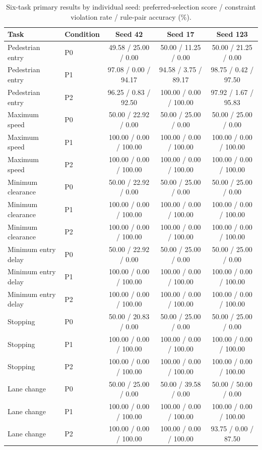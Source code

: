 \documentclass[10pt]{article}
\begin{document}
\begin{table}[tbp]
\centering\footnotesize\setlength{\tabcolsep}{3pt}
\caption{Six-task primary results by individual seed: preferred-selection score / constraint violation rate / rule-pair accuracy (\%).}
\label{tab:sup-primary-seeds}
\begin{tabular}{llccc}
\toprule
Task & Condition & Seed 42 & Seed 17 & Seed 123\\
\midrule
Pedestrian entry & P0 & 49.58 / 25.00 / 0.00 & 50.00 / 11.25 / 0.00 & 50.00 / 21.25 / 0.00\\
Pedestrian entry & P1 & 97.08 / 0.00 / 94.17 & 94.58 / 3.75 / 89.17 & 98.75 / 0.42 / 97.50\\
Pedestrian entry & P2 & 96.25 / 0.83 / 92.50 & 100.00 / 0.00 / 100.00 & 97.92 / 1.67 / 95.83\\
Maximum speed & P0 & 50.00 / 22.92 / 0.00 & 50.00 / 25.00 / 0.00 & 50.00 / 25.00 / 0.00\\
Maximum speed & P1 & 100.00 / 0.00 / 100.00 & 100.00 / 0.00 / 100.00 & 100.00 / 0.00 / 100.00\\
Maximum speed & P2 & 100.00 / 0.00 / 100.00 & 100.00 / 0.00 / 100.00 & 100.00 / 0.00 / 100.00\\
Minimum clearance & P0 & 50.00 / 22.92 / 0.00 & 50.00 / 25.00 / 0.00 & 50.00 / 25.00 / 0.00\\
Minimum clearance & P1 & 100.00 / 0.00 / 100.00 & 100.00 / 0.00 / 100.00 & 100.00 / 0.00 / 100.00\\
Minimum clearance & P2 & 100.00 / 0.00 / 100.00 & 100.00 / 0.00 / 100.00 & 100.00 / 0.00 / 100.00\\
Minimum entry delay & P0 & 50.00 / 22.92 / 0.00 & 50.00 / 25.00 / 0.00 & 50.00 / 25.00 / 0.00\\
Minimum entry delay & P1 & 100.00 / 0.00 / 100.00 & 100.00 / 0.00 / 100.00 & 100.00 / 0.00 / 100.00\\
Minimum entry delay & P2 & 100.00 / 0.00 / 100.00 & 100.00 / 0.00 / 100.00 & 100.00 / 0.00 / 100.00\\
Stopping & P0 & 50.00 / 20.83 / 0.00 & 50.00 / 25.00 / 0.00 & 50.00 / 25.00 / 0.00\\
Stopping & P1 & 100.00 / 0.00 / 100.00 & 100.00 / 0.00 / 100.00 & 100.00 / 0.00 / 100.00\\
Stopping & P2 & 100.00 / 0.00 / 100.00 & 100.00 / 0.00 / 100.00 & 100.00 / 0.00 / 100.00\\
Lane change & P0 & 50.00 / 25.00 / 0.00 & 50.00 / 39.58 / 0.00 & 50.00 / 50.00 / 0.00\\
Lane change & P1 & 100.00 / 0.00 / 100.00 & 100.00 / 0.00 / 100.00 & 100.00 / 0.00 / 100.00\\
Lane change & P2 & 100.00 / 0.00 / 100.00 & 100.00 / 0.00 / 100.00 & 93.75 / 0.00 / 87.50\\
\bottomrule
\end{tabular}
\end{table}
\end{document}
